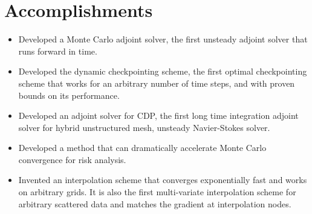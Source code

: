 \section{Accomplishments}
\begin{itemize}
\item Developed a Monte Carlo adjoint solver, the first unsteady adjoint solver
      that runs forward in time.
\item Developed the dynamic checkpointing scheme, the first optimal
      checkpointing scheme that works for an arbitrary number of time steps,
      and with proven bounds on its performance.
\item Developed an adjoint solver for CDP, the first long time integration
      adjoint solver for hybrid unstructured mesh,
      unsteady Navier-Stokes solver.
\item Developed a method that can dramatically accelerate Monte Carlo
      convergence for risk analysis.
\item Invented an interpolation scheme that converges exponentially fast
      and works on arbitrary grids.  It is also the first multi-variate
      interpolation scheme for arbitrary scattered data and matches the
      gradient at interpolation nodes.
\end{itemize}


